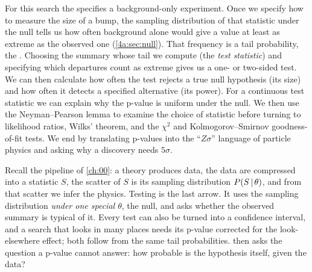 For this search the  specifies a background-only
experiment. Once we specify how to measure the size of a bump, the sampling
distribution of that statistic under the null tells us how often background
alone would give a value at least as extreme as the observed one
(\cref{4a:sec:null}). That frequency is a tail probability, the
. Choosing the summary whose tail we compute (the \emph{test statistic}) and
specifying which departures count as extreme gives us a one- or two-sided
test. We can then calculate how often the test rejects a true null hypothesis
(its size) and how often it detects a specified alternative (its power). For a continuous test
statistic we can explain why the p-value is uniform under the null. We then
use the Neyman--Pearson lemma to examine the choice of statistic before
turning to likelihood ratios, Wilks' theorem, and the $\chi^2$ and
Kolmogorov--Smirnov goodness-of-fit tests. We end by translating
p-values into the ``$Z\sigma$'' language of particle physics and asking why a
discovery needs $5\sigma$.

Recall the pipeline of \cref{ch:00}: a theory produces data, the data are
compressed into a statistic $S$, the scatter of $S$ is its sampling
distribution $P(S\,\vert\,\theta)$, and from that scatter we infer the physics.
Testing is the last arrow. It uses the sampling distribution \emph{under one
special $\theta$}, the null, and asks whether the observed summary is typical
of it. Every test can also be turned into a confidence interval, and a search
that looks in many places needs its p-value corrected for the look-elsewhere
effect; both follow from the same tail probabilities.  then asks
the question a p-value cannot answer: how probable is the hypothesis itself,
given the data?

